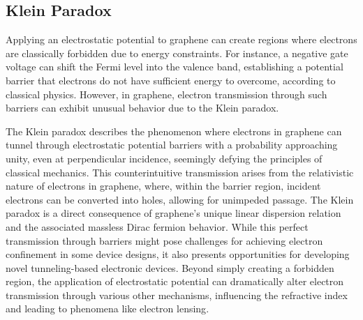 %

\subsection{Klein Paradox}\label{subsec:kleinParadox}

Applying an electrostatic potential to graphene can create regions where electrons are classically forbidden due to energy constraints\cite{SoninPhysRevB2009}.
For instance, a negative gate voltage can shift the Fermi level into the valence band, establishing a potential barrier that electrons do not have sufficient energy to overcome, according to classical physics\cite{DellAnnaJPhysCondMatt2018}.
However, in graphene, electron transmission through such barriers can exhibit unusual behavior due to the Klein paradox.

The Klein paradox describes the phenomenon where electrons in graphene can tunnel through electrostatic potential barriers with a probability approaching unity, even at perpendicular incidence, seemingly defying the principles of classical mechanics\cite{TrauzettelNature2007}.
This counterintuitive transmission arises from the relativistic nature of electrons in graphene, where, within the barrier region, incident electrons can be converted into holes, allowing for unimpeded passage\cite{BernardiniJPhysAMathTheor2010}.
The Klein paradox is a direct consequence of graphene's unique linear dispersion relation and the associated massless Dirac fermion behavior.
While this perfect transmission through barriers might pose challenges for achieving electron confinement in some device designs, it also presents opportunities for developing novel tunneling-based electronic devices.
Beyond simply creating a forbidden region, the application of electrostatic potential can dramatically alter electron transmission through various other mechanisms, influencing the refractive index and leading to phenomena like electron lensing\cite{ParedesPhysRevB2021}.

